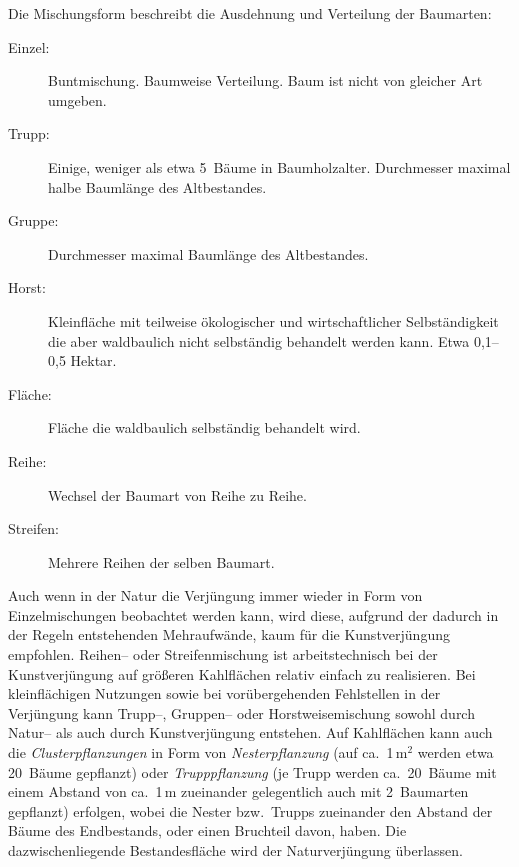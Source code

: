 \documentclass[twocolumn]{scrartcl}
\begin{document}
Die Mischungsform beschreibt die Ausdehnung und Verteilung der
Baumarten:

\begin{description}
\item[Einzel:] Buntmischung. Baumweise Verteilung. Baum ist nicht von gleicher Art umgeben.
\item[Trupp:] Einige, weniger als etwa 5~Bäume in Baumholzalter. Durchmesser maximal halbe Baumlänge des Altbestandes.
\item[Gruppe:] Durchmesser maximal Baumlänge des Altbestandes.
\item[Horst:] Kleinfläche mit teilweise ökologischer und wirtschaftlicher Selbständigkeit die aber waldbaulich nicht selbständig behandelt werden kann. Etwa 0,1--0,5 Hektar.
\item[Fläche:] Fläche die waldbaulich selbständig behandelt wird.
\item[Reihe:] Wechsel der Baumart von Reihe zu Reihe.
\item[Streifen:] Mehrere Reihen der selben Baumart.
\end{description}

Auch wenn in der Natur die Verjüngung immer wieder in Form von
Einzelmischungen beobachtet werden kann, wird diese, aufgrund der
dadurch in der Regeln entstehenden Mehraufwände, kaum für die
Kunstverjüngung empfohlen. Reihen-- oder Streifenmischung ist
arbeitstechnisch bei der Kunstverjüngung auf größeren Kahlflächen
relativ einfach zu realisieren. Bei kleinflächigen Nutzungen sowie bei
vorübergehenden Fehlstellen in der Verjüngung kann Trupp--, Gruppen--
oder Horstweisemischung sowohl durch Natur-- als auch durch
Kunstverjüngung entstehen. Auf Kahlflächen kann auch die
\emph{Clusterpflanzungen} in Form von \emph{Nesterpflanzung} (auf ca.\
1\,m$^2$ werden etwa 20~Bäume gepflanzt) oder \emph{Trupppflanzung}
(je Trupp werden ca.\ 20~Bäume mit einem Abstand von ca.\ 1\,m
zueinander gelegentlich auch mit 2~Baumarten gepflanzt) erfolgen,
wobei die Nester bzw.\ Trupps zueinander den Abstand der Bäume des
Endbestands, oder einen Bruchteil davon, haben. Die dazwischenliegende
Bestandesfläche wird der Naturverjüngung überlassen.
\end{document}
